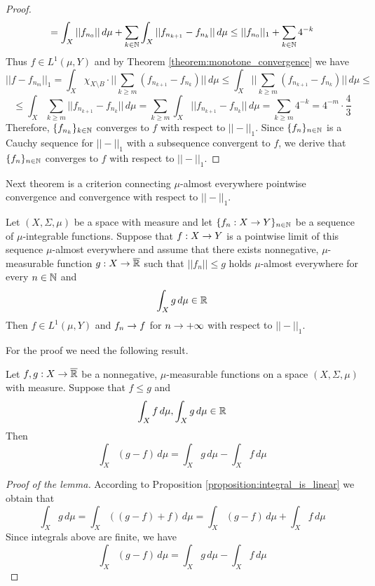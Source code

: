 \begin{proof}
$$= \int_X||f_{n_0}||\,d\mu + \sum_{k\in {\mathbb N}}\int_X||f_{n_{k+1}}-f_{n_k}||\,d\mu \leq ||f_{n_0}||_1 + \sum_{k\in {\mathbb N}}4^{-k} $$
Thus $f\in L^1(\mu,Y)$ and by Theorem \ref{theorem:monotone_convergence} we have
$$||f - f_{n_m}||_1 = \int_X\chi_{X\setminus B}\cdot \big|\big|\sum_{k\geq m}\left(f_{n_{k+1}} - f_{n_k}\right)\big|\big|\,d\mu \leq  \int_X \big|\big|\sum_{k\geq m}\left(f_{n_{k+1}} - f_{n_k}\right)\big|\big|\,d\mu \leq $$
$$\leq \int_X\sum_{k\geq m}\big|\big|f_{n_{k+1}} - f_{n_k}\big|\big|\,d\mu =\sum_{k\geq m}\int_X\big|\big|f_{n_{k+1}} - f_{n_k}\big|\big|\,d\mu = \sum_{k\geq m}4^{-k} = 4^{-m}\cdot \frac{4}{3} $$
Therefore, $\{f_{n_k}\}_{k\in {\mathbb N}}$ converges to $f$ with respect to $||-||_1$. Since $\{f_n\}_{n\in {\mathbb N}}$ is a Cauchy sequence for $||-||_1$ with a subsequence convergent to $f$, we derive that $\{f_n\}_{n\in {\mathbb N}}$ converges to $f$ with respect to $||-||_1$.
\end{proof}
\noindent
Next theorem is a criterion connecting $\mu$-almost everywhere pointwise convergence and convergence with respect to $||-||_1$.

\begin{theorem}\label{theorem:dominated_convergence}
Let $(X,\Sigma,\mu)$ be a space with measure and let $\{f_n:X\rightarrow Y\}_{n\in {\mathbb N}}$ be a sequence of $\mu$-integrable functions. Suppose that $f:X\rightarrow Y$ is a pointwise limit of this sequence $\mu$-almost everywhere and assume that there exists nonnegative, $\mu$-measurable function $g:X\rightarrow \overline{{\mathbb R}}$ such that $||f_n||\leq g$ holds $\mu$-almost everywhere for every $n\in {\mathbb N}$ and
$$\int_X g\,d\mu\in {\mathbb R}$$
Then $f\in L^1(\mu,Y)$ and $f_n \rightarrow f$ for $n\rightarrow +\infty$ with respect to $||-||_1$.
\end{theorem}
For the proof we need the following result.

\begin{lemma}\label{lemma:difference_of_integrals}
Let $f, g:X\rightarrow \overline{{\mathbb R}}$ be a nonnegative, $\mu$-measurable functions on a space $(X,\Sigma,\mu)$ with measure. Suppose that $f\leq g$ and
$$\int_Xf\,d\mu, \int_Xg\,d\mu\in {\mathbb R}$$
Then
$$\int_X(g-f)\,d\mu = \int_Xg\,d\mu - \int_Xf\,d\mu$$
\end{lemma}
\begin{proof}[Proof of the lemma]
According to Proposition \ref{proposition:integral_is_linear} we obtain that
$$\int_Xg\,d\mu = \int_X\left((g-f) + f\right)\,d\mu = \int_X(g-f)\,d\mu + \int_Xf\,d\mu$$
Since integrals above are finite, we have
$$\int_X(g-f)\,d\mu = \int_Xg\,d\mu - \int_Xf\,d\mu$$
\end{proof}


